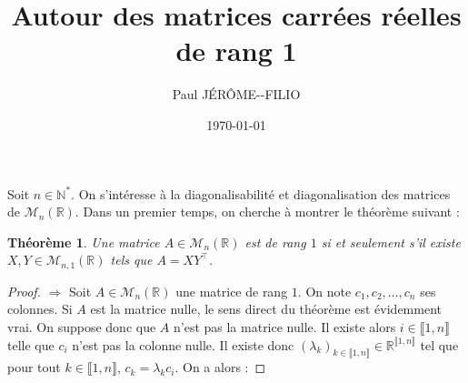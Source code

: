 \documentclass[a4paper]{article}
\title{Autour des matrices carrées réelles de rang 1}
\date{\today}
\author{Paul JÉRÔME-\--FILIO}
\newtheorem*{theorem}{Théorème}
\begin{document}
\maketitle
\allowdisplaybreaks

Soit $n \in \mathbb{N}^*$. On s'intéresse à la diagonalisabilité et diagonalisation des matrices de $\mathcal{M}_{n}(\mathbb{R})$. Dans un premier temps, on cherche à montrer le théorème suivant :

\begin{theorem}
    Une matrice $A \in \mathcal{M}_{n}(\mathbb{R})$ est de rang $1$ si et seulement s'il existe $X, Y \in \mathcal{M}_{n, 1}(\mathbb{R})$ tels que $A = XY^\top$.
\end{theorem}

\begin{proof}
    $\boxed{\Rightarrow}$ Soit $A \in \mathcal{M}_{n}(\mathbb{R})$ une matrice de rang $1$. On note $c_1, c_2, \dots, c_n$ ses colonnes. Si $A$ est la matrice nulle, le sens direct du théorème est évidemment vrai. On suppose donc que $A$ n'est pas la matrice nulle. Il existe alors $i \in \llbracket 1, n \rrbracket$ telle que $c_i$ n'est pas la colonne nulle. Il existe donc $\left(\lambda_k\right)_{k \in \llbracket 1, n \rrbracket} \in \mathbb{R}^{\llbracket 1, n \rrbracket}$ tel que pour tout $k \in \llbracket 1, n \rrbracket$, $c_k = \lambda_k c_i$. On a alors :
    

\end{proof}
\end{document}
